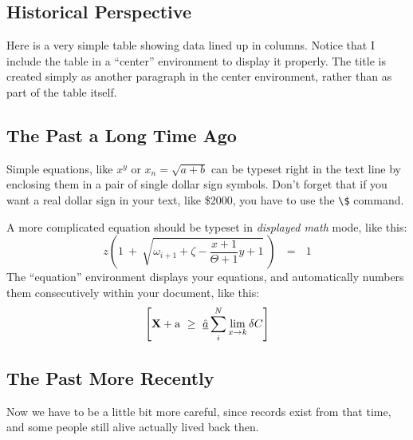 \documentclass[12pt,a4paper]{mvgl}
\begin{document}
\begin{mvglReport}
\clearpage
\renewcommand{\thesection}{\Alph{section}}
\setcounter{section}{0}

\section{Historical Perspective}
Here is a very simple table showing data lined up in columns. Notice that I include the table in a ``center'' environment to display it properly. The title is created simply as another paragraph in the center environment, rather than as part of the table itself.

\subsection{The Past a Long Time Ago}
Simple equations, like $x^y$ or $x_n = \sqrt{a + b}$ can be typeset right
in the text line by enclosing them in a pair of single dollar sign symbols.
Don't forget that if you want a real dollar sign in your text, like \$2000,
you have to use the \verb+\$+ command.

A more complicated equation should be typeset in {\em displayed math\/} mode,
like this:
\[
z \left( 1 \ +\ \sqrt{\omega_{i+1} + \zeta -\frac{x+1}{\Theta +1} y + 1}
\ \right)
\ \ \ =\ \ \ 1
\]
The ``equation'' environment displays your equations, and automatically
numbers them consecutively within your document, like this:
\begin{equation}
\left[
{\bf X} + {\rm a} \ \geq\
\underline{\hat a} \sum_i^N \lim_{x \rightarrow k} \delta C
\right]
\end{equation}

\subsection{The Past More Recently}
Now we have to be a little bit more careful, since records exist from
that time, and some people still alive actually lived back then.


\end{mvglReport}
\end{document}
